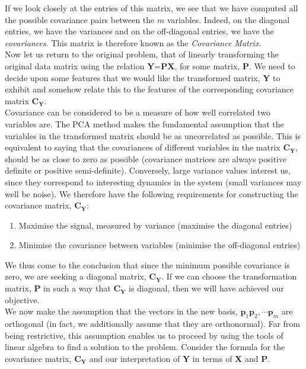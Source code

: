 \documentclass[12pt]{article}
\theoremstyle{plain}
\begin{document}
If we look closely at the entries of this matrix, we see that we have computed all the possible covariance pairs between the $m$ variables. Indeed, on the diagonal entries, we have the variances and on the off-diagonal entries, we have the \emph{covariances}. This matrix is therefore known as the \emph{Covariance Matrix.}
\\

Now let us return to the original problem, that of linearly transforming the original data matrix using the relation \textbf{Y}=\textbf{PX}, for some matrix, \textbf{P}. We need to decide upon some features that we would like the transformed matrix, \textbf{Y} to exhibit and somehow relate this to the features of the corresponding covariance matrix $\textbf{C}_{\textbf{Y}}$.
\\

Covariance can be considered to be a measure of how well correlated two variables are. The PCA method makes the fundamental assumption that the variables in the transformed matrix should be as uncorrelated as possible. This is equivalent to saying that the covariances of different variables in the matrix $\textbf{C}_{\textbf{Y}}$, should be as close to zero as possible (covariance matrices are always positive definite or positive semi-definite). Conversely, large variance values interest us, since they correspond to interesting dynamics in the system (small variances may well be noise). We therefore have the following requirements for constructing the covariance matrix, $\textbf{C}_{\textbf{Y}}$:
\begin{enumerate}
\item  Maximise the signal, measured by variance (maximise the diagonal entries)
\item  Minimise the covariance between variables (minimise the off-diagonal entries)
\end{enumerate}

We thus come to the conclusion that since the minimum possible covariance is zero, we are seeking a diagonal matrix, $\textbf{C}_{\textbf{Y}}$. If we can choose the transformation matrix, \textbf{P} in such a way that $\textbf{C}_{\textbf{Y}}$ is diagonal, then we will have achieved our objective.
\\

We now make the assumption that the vectors in the new basis, $\textbf{p}_1 \textbf{p}_2, \cdots \textbf{p}_m$ are orthogonal (in fact, we additionally assume that they are orthonormal). Far from being restrictive, this assumption enables us to proceed by using the tools of linear algebra to find a solution to the problem. Consider the formula for the covariance matrix, $\textbf{C}_{\textbf{Y}}$ and our interpretation of \textbf{Y} in terms of \textbf{X} and \textbf{P}.
\end{document}

